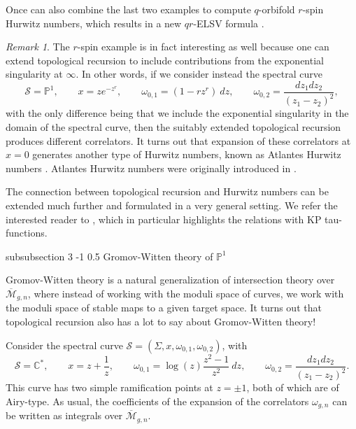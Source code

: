 \documentclass[reqno,oneside,11pt]{amsart}
\makeatletter
\theoremstyle{plain}
\theoremstyle{definition}
\theoremstyle{remark}
\newtheorem{remark}[theorem]{Remark}
\numberwithin{equation}{section}
\renewcommand{\subsubsection}{\@startsection
{subsubsection}%
{3}%
{\z@}%
{-1\baselineskip}%
{0.5\baselineskip}%
{\normalfont \it \normalsize}} %
\makeatother
\begin{document}
  Once can also combine the last two examples to compute $q$-orbifold $r$-spin Hurwitz numbers, which results in a new $qr$-ELSV formula \cite{DKPS19}.
 
 \begin{remark}
 The $r$-spin example is in fact interesting as well because one can extend topological recursion to include contributions from the exponential singularity at $\infty$. In other words, if we consider instead the spectral curve 
    \begin{equation}
 \mathcal{S} = \mathbb{P}^1, \qquad x = z e^{-z^r}, \qquad \omega_{0,1} = (1-r z^r)\ dz, \qquad \omega_{0,2} = \frac{dz_1 dz_2}{(z_1-z_2)^2},
 \end{equation}
 with the only difference being that we include the exponential singularity in the domain of the spectral curve, then the suitably extended topological recursion produces different correlators. It turns out that expansion of these correlators at $x=0$ generates another type of Hurwitz numbers, known as Atlantes Hurwitz numbers \cite{BKW23}. Atlantes Hurwitz numbers were originally introduced in \cite{ALS16}.
 \end{remark}
 
 The connection between topological recursion and Hurwitz numbers can be extended much further and formulated in a very general setting. We refer the interested reader to \cite{ACEH20,BDKS20,BDKS20b}, which in particular highlights the relations with KP tau-functions.
 

\subsubsection{Gromov-Witten theory of $\mathbb{P}^1$}

Gromov-Witten theory is a natural generalization of intersection theory over $\overline{\mathcal{M}}_{g,n}$, where instead of working with the moduli space of curves, we work with the moduli space of stable maps to a given target space. It turns out that topological recursion also has a lot to say about Gromov-Witten theory!

Consider the spectral curve $\mathcal{S} = (\Sigma, x, \omega_{0,1}, \omega_{0,2})$, with 
 \begin{equation}
 \mathcal{S} = \mathbb{C}^*, \qquad x = z + \frac{1}{z}, \qquad \omega_{0,1} = \log(z) \frac{z^2-1}{z^2}\ dz, \qquad \omega_{0,2} = \frac{dz_1 dz_2}{(z_1-z_2)^2}.
 \end{equation}
 This curve has two simple ramification points at $z = \pm 1$, both of which are of Airy-type. As usual, the coefficients of the expansion of the correlators $\omega_{g,n}$ can be written as integrals over $\overline{\mathcal{M}}_{g,n}$.
 
\end{document}
